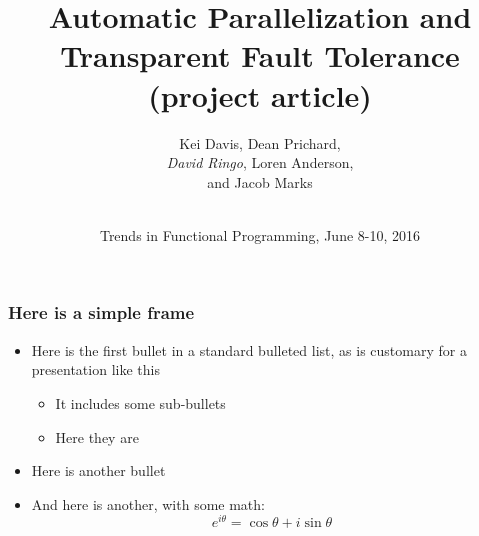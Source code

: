 \documentclass{beamer}
\title{Automatic Parallelization and Transparent Fault Tolerance (project article)}
\author{Kei Davis, Dean Prichard, \\\emph{David Ringo}, Loren Anderson, \\and Jacob Marks\\ \ \\}
\date{Trends in Functional Programming, June 8-10, 2016}
\begin{document}
\begin{frame}
\maketitle
\end{frame}

\begin{frame}
\frametitle{Here is a simple frame}
    \begin{itemize}
        \item Here is the first bullet in a standard bulleted list,
            as is customary for a presentation like this
        \begin{itemize}
            \item It includes some sub-bullets
            \item Here they are
        \end{itemize}
        \item Here is another bullet
        \item And here is another, with some math:
            \[ e^{i\theta} = \cos \theta + i \sin \theta \]
    \end{itemize}
\end{frame}
\end{document}
